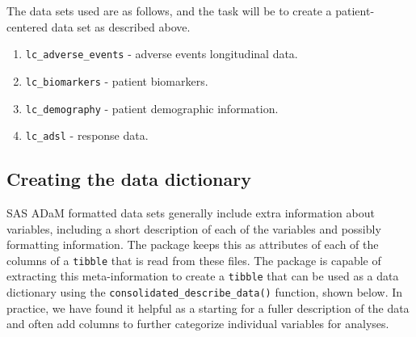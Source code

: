 The data sets used are as follows, and the task will be to create a
patient-centered data set as described above.

\begin{enumerate}
\def\labelenumi{\arabic{enumi}.}
\tightlist
\item
  \texttt{lc\_adverse\_events} - adverse events longitudinal data.
\item
  \texttt{lc\_biomarkers} - patient biomarkers.
\item
  \texttt{lc\_demography} - patient demographic information.
\item
  \texttt{lc\_adsl} - response data.
\end{enumerate}

\hypertarget{creating-the-data-dictionary}{%
\subsection{Creating the data
dictionary}\label{creating-the-data-dictionary}}

SAS ADaM formatted data sets generally include extra information about
variables, including a short description of each of the variables and
possibly formatting information. The  package keeps this as
attributes of each of the columns of a \texttt{tibble} that is read from
these files. The  package is capable of extracting this
meta-information to create a \texttt{tibble} that can be used as a data
dictionary using the \texttt{consolidated\_describe\_data()} function,
shown below. In practice, we have found it helpful as a starting for a
fuller description of the data and often add columns to further
categorize individual variables for analyses.

